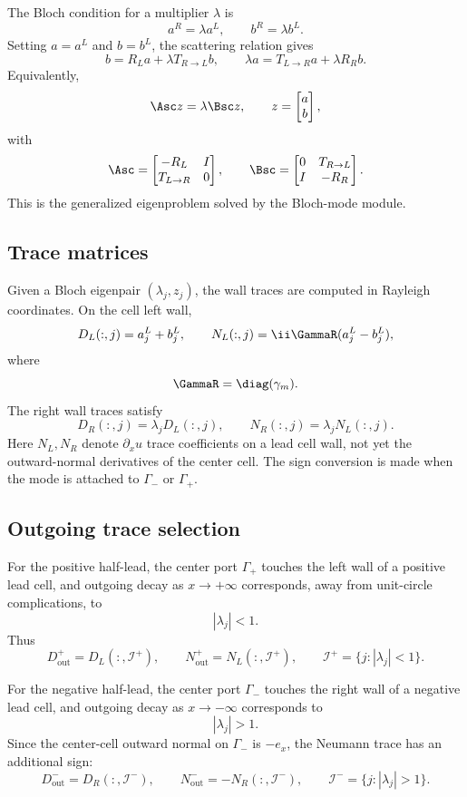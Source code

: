 The Bloch condition for a multiplier \(\lambda\) is
\[
  a^R=\lambda a^L,
  \qquad
  b^R=\lambda b^L .
\]
Setting \(a=a^L\) and \(b=b^L\), the scattering relation gives
\[
  b=R_La+\lambda T_{R\to L}b,
  \qquad
  \lambda a=T_{L\to R}a+\lambda R_Rb .
\]
Equivalently,
\[
  \Asc z=\lambda \Bsc z,
  \qquad
  z=\begin{bmatrix}a\\ b\end{bmatrix},
\]
with
\[
  \Asc=
  \begin{bmatrix}
  -R_L&I\\
  T_{L\to R}&0
  \end{bmatrix},
  \qquad
  \Bsc=
  \begin{bmatrix}
  0&T_{R\to L}\\
  I&-R_R
  \end{bmatrix}.
\]
This is the generalized eigenproblem solved by the Bloch-mode module.

\subsection{Trace matrices}

Given a Bloch eigenpair \((\lambda_j,z_j)\), the wall traces are computed in
Rayleigh coordinates.  On the cell left wall,
\[
  D_L(:,j)=a_j^L+b_j^L,
  \qquad
  N_L(:,j)=\ii\GammaR(a_j^L-b_j^L),
\]
where
\[
  \GammaR=\diag(\gamma_m) .
\]
The right wall traces satisfy
\[
  D_R(:,j)=\lambda_jD_L(:,j),
  \qquad
  N_R(:,j)=\lambda_jN_L(:,j).
\]
Here \(N_L,N_R\) denote \(\partial_x u\) trace coefficients on a lead cell wall,
not yet the outward-normal derivatives of the center cell.  The sign conversion
is made when the mode is attached to \(\Gamma_-\) or \(\Gamma_+\).

\subsection{Outgoing trace selection}

For the positive half-lead, the center port \(\Gamma_+\) touches the left wall
of a positive lead cell, and outgoing decay as \(x\to+\infty\) corresponds, away
from unit-circle complications, to
\[
  |\lambda_j|<1 .
\]
Thus
\[
  D_{\mathrm{out}}^+=D_L(:,\mathcal I^+),
  \qquad
  N_{\mathrm{out}}^+=N_L(:,\mathcal I^+),
  \qquad
  \mathcal I^+=\{j:|\lambda_j|<1\}.
\]

For the negative half-lead, the center port \(\Gamma_-\) touches the right wall
of a negative lead cell, and outgoing decay as \(x\to-\infty\) corresponds to
\[
  |\lambda_j|>1 .
\]
Since the center-cell outward normal on \(\Gamma_-\) is \(-e_x\), the Neumann
trace has an additional sign:
\[
  D_{\mathrm{out}}^-=D_R(:,\mathcal I^-),
  \qquad
  N_{\mathrm{out}}^-=-N_R(:,\mathcal I^-),
  \qquad
  \mathcal I^-=\{j:|\lambda_j|>1\}.
\]

